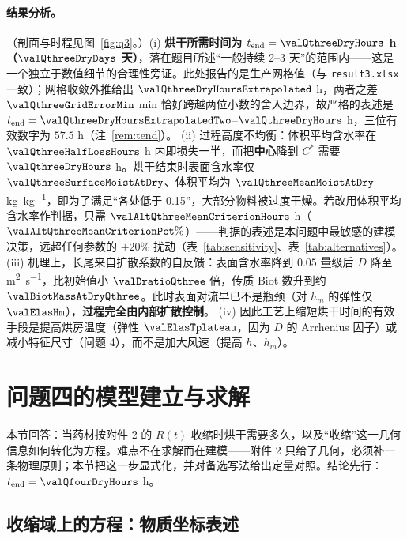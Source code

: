 \paragraph{结果分析。}（剖面与时程见图~\ref{fig:q3}。）(i) \textbf{烘干所需时间为 $t_{\mathrm{end}}=\valQthreeDryHours$ h（$\valQthreeDryDays$ 天）}，落在题目所述“一般持续 2--3 天”的范围内——这是一个独立于数值细节的合理性旁证。此处报告的是生产网格值（与 \nolinkurl{result3.xlsx} 一致）；网格收敛外推给出 $\valQthreeDryHoursExtrapolated$ h，两者之差 $\valQthreeGridErrorMin$ \si{\minute} 恰好跨越两位小数的舍入边界，故严格的表述是 $t_{\mathrm{end}}=\valQthreeDryHoursExtrapolatedTwo$--$\valQthreeDryHours$ h，三位有效数字为 $57.5$ h（注~\ref{rem:tend}）。
(ii) 过程高度不均衡：体积平均含水率在 $\valQthreeHalfLossHours$ h 内即损失一半，而把\textbf{中心}降到 $C^\ast$ 需要 $\valQthreeDryHours$ h。烘干结束时表面含水率仅 $\valQthreeSurfaceMoistAtDry$、体积平均为 $\valQthreeMeanMoistAtDry$ \si{\kilo\gram\per\kilo\gram}，即为了满足“各处低于 0.15”，大部分物料被过度干燥。若改用体积平均含水率作判据，只需 $\valAltQthreeMeanCriterionHours$ h（$\valAltQthreeMeanCriterionPct\%$）——判据的表述是本问题中最敏感的建模决策，远超任何参数的 $\pm20\%$ 扰动（表~\ref{tab:sensitivity}、表~\ref{tab:alternatives}）。
(iii) 机理上，长尾来自扩散系数的自反馈：表面含水率降到 $0.05$ 量级后 $D$ 降至 \sci{\valDsurfaceAtDryQthree} \si{\square\meter\per\second}，比初始值小 $\valDratioQthree$ 倍，传质 Biot 数升到约 $\valBiotMassAtDryQthree$。此时表面对流早已不是瓶颈（对 $h_m$ 的弹性仅 $\valElasHm$），\textbf{过程完全由内部扩散控制}。
(iv) 因此工艺上缩短烘干时间的有效手段是提高烘房温度（弹性 $\valElasTplateau$，因为 $D$ 的 Arrhenius 因子）或减小特征尺寸（问题 4），而不是加大风速（提高 $h$、$h_m$）。

\FloatBarrier
\section{问题四的模型建立与求解}
\label{sec:q4}

本节回答：当药材按附件 2 的 $R(t)$ 收缩时烘干需要多久，以及“收缩”这一几何信息如何转化为方程。难点不在求解而在建模——附件 2 只给了几何，必须补一条物理原则；本节把这一步显式化，并对备选写法给出定量对照。结论先行：$t_{\mathrm{end}}=\valQfourDryHours$ h。

\subsection{收缩域上的方程：物质坐标表述}
\label{subsec:q4model}

